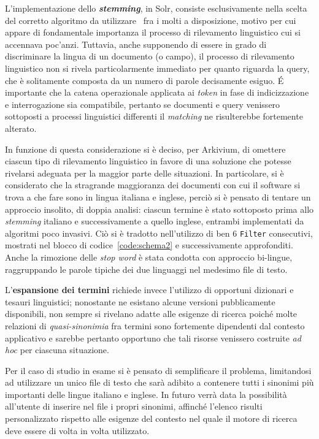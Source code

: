 \vspace{1em}

L’implementazione dello \textbf{\textit{stemming}}, in Solr, consiste esclusivamente nella scelta del corretto algoritmo da utilizzare~\cite{elasticstemming} fra i molti a disposizione, motivo per cui appare di fondamentale importanza il processo di rilevamento linguistico cui si accennava poc’anzi. Tuttavia, anche supponendo di essere in grado di discriminare la lingua di un documento (o campo), il processo di rilevamento linguistico non si rivela particolarmente immediato per quanto riguarda la query, che è solitamente composta da un numero di parole decisamente esiguo. É importante che la catena operazionale applicata ai \textit{token} in fase di indicizzazione e interrogazione sia compatibile, pertanto se documenti e query venissero sottoposti a processi linguistici differenti il \textit{matching} ne risulterebbe fortemente alterato.

In funzione di questa considerazione si è deciso, per Arkivium, di omettere ciascun tipo di rilevamento linguistico in favore di una soluzione che potesse rivelarsi adeguata per la maggior parte delle situazioni. In particolare, si è considerato che la stragrande maggioranza dei documenti con cui il software si trova a che fare sono in lingua italiana e inglese, perciò si è pensato di tentare un approccio insolito, di doppia analisi: ciascun termine è stato sottoposto prima allo \textit{stemming} italiano e successivamente a quello inglese, entrambi implementati da algoritmi poco invasivi. Ciò si è tradotto nell’utilizzo di ben 6 \texttt{Filter} consecutivi, mostrati nel blocco di codice~\ref{code:schema2} e successivamente approfonditi. Anche la rimozione delle \textit{stop word} è stata condotta con approccio bi-lingue, raggruppando le parole tipiche dei due linguaggi nel medesimo file di testo.

\vspace{1em}

L’\textbf{espansione dei termini} richiede invece l’utilizzo di opportuni dizionari e tesauri linguistici; nonostante ne esistano alcune versioni pubblicamente disponibili, non sempre si rivelano adatte alle esigenze di ricerca poiché molte relazioni di \textit{quasi-sinonimia} fra termini sono fortemente dipendenti dal contesto applicativo e sarebbe pertanto opportuno che tali risorse venissero costruite \textit{ad hoc} per ciascuna situazione.

Per il caso di studio in esame si è pensato di semplificare il problema, limitandosi ad utilizzare un unico file di testo che sarà adibito a contenere tutti i sinonimi più importanti delle lingue italiano e inglese. In futuro verrà data la possibilità all’utente di inserire nel file i propri sinonimi, affinché l’elenco risulti personalizzato rispetto alle esigenze del contesto nel quale il motore di ricerca deve essere di volta in volta utilizzato.



